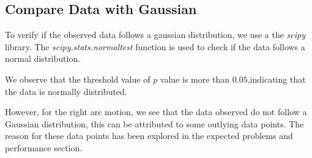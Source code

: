 \documentclass[10pt,a4paper]{article}
\begin{document}
			\subsection{Compare Data with Gaussian}
			To verify if the observed data follows a gaussian distribution, we use a the \textit{scipy} library. The \textit{scipy.stats.normaltest} function is used to check if the data follows a normal distribution. 
			
			We observe that the threshold value of $p$ value is more than $0.05$,indicating that the data is normally distributed.
			
			However, for the right arc motion, we see that the data observed do not follow a Gaussian distribution, this can be attributed to some outlying data points. The reason for these data points has been explored in the expected problems and performance section.
			
\end{document}
